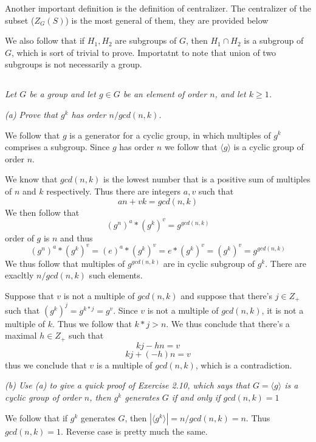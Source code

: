 \documentclass[11pt,oneside,titlepage]{book}
\newcommand{\eangle}[1]{\langle #1 \rangle}
\begin{document}
Another important definition is the definition of centralizer.  The
centralizer of the subset ($Z_G(S)$) is the most general of them, they
are provided below

We also follow that if $H_1, H_2$ are subgroups of $G$, then $H_1 \cap
H_2$ is a subgroup of $G$, which is sort of trivial to prove. Importatnt
to note that union of two subgroups is not necessarily a group.

\subsection{}

\textit{Let $G$ be a group and let $g \in G$ be an element of order
  $n$, and let $k \geq 1$.}

\textit{(a) Prove that $g^k$ has order $n / gcd(n, k)$.}

We follow that $g$ is a generator for a cyclic group, in which
multiples of $g^k$ comprises a subgroup. Since $g$ has order $n$ we
follow that $\eangle{g}$ is a cyclic group of order $n$.

We know that $gcd(n, k)$ is the lowest number that is a positive sum
of multiples of $n$ and $k$ respectively. Thus there are integers
$a, v$ such that
$$an + vk = gcd(n, k)$$
We then follow that
$$(g^n)^a * (g^k)^v = g^{gcd(n, k)}$$
order of $g$ is $n$ and thus
$$(g^n)^a * (g^k)^v = (e)^a * (g^k)^v = e * (g^k)^v = (g^k)^v = g^{gcd(n, k)}$$
We thus follow that multiples of $g^{gcd(n, k)}$ are in cyclic
subgroup of $g^k$. There are exacltly $n / gcd(n, k)$ such elements.

Suppose that $v$ is not a multiple of $gcd(n, k)$ and suppose that
there's $j \in Z_+$ such that $(g^k)^j = g^{k * j} = g^v$. Since $v$ is
not a multiple of $gcd(n, k)$, it is not a multiple of $k$. Thus we
follow that $k * j > n$. We thus conclude that there's a maximal $h \in Z_+$
such that
$$kj - hn = v$$
$$kj + (-h)n = v$$
thus we conclude that $v$ is a multiple of $gcd(n, k)$, which is a
contradiction.

\textit{(b) Use (a) to give a quick proof of Exercise 2.10, which says
  that $G = \eangle{g}$ is a cyclic group of order $n$, then $g^k$
  generates $G$ if and only if $gcd(n, k) = 1$ }

We follow that if $g^k$ generates $G$, then $|\eangle{g^k}| = n / gcd(n,
k) = n$. Thus $gcd(n, k) = 1$. Reverse case is pretty much the same.

\subsection{}
\end{document}
